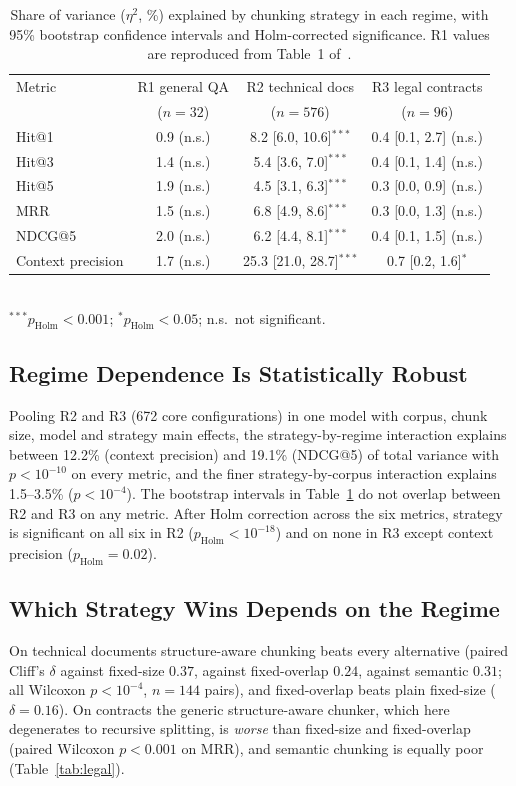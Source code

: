 \documentclass[runningheads]{llncs}
\begin{document}
\begin{table}[t]
\caption{Share of variance ($\eta^2$, \%) explained by chunking strategy in each regime, with 95\% bootstrap confidence intervals and Holm-corrected significance. R1 values are reproduced from Table~1 of~\cite{chauhan2026chunking}.}
\label{tab:regimes}
\centering
\small
\setlength{\tabcolsep}{4pt}
\begin{tabular}{lccc}
\toprule
Metric & R1 general QA & R2 technical docs & R3 legal contracts \\
 & ($n=32$) & ($n=576$) & ($n=96$) \\
\midrule
Hit@1 & 0.9 (n.s.) & 8.2 [6.0, 10.6]$^{***}$ & 0.4 [0.1, 2.7] (n.s.) \\
Hit@3 & 1.4 (n.s.) & 5.4 [3.6, 7.0]$^{***}$ & 0.4 [0.1, 1.4] (n.s.) \\
Hit@5 & 1.9 (n.s.) & 4.5 [3.1, 6.3]$^{***}$ & 0.3 [0.0, 0.9] (n.s.) \\
MRR & 1.5 (n.s.) & 6.8 [4.9, 8.6]$^{***}$ & 0.3 [0.0, 1.3] (n.s.) \\
NDCG@5 & 2.0 (n.s.) & 6.2 [4.4, 8.1]$^{***}$ & 0.4 [0.1, 1.5] (n.s.) \\
Context precision & 1.7 (n.s.) & 25.3 [21.0, 28.7]$^{***}$ & 0.7 [0.2, 1.6]$^{*}$ \\
\bottomrule
\end{tabular}
\\[2pt]{\footnotesize $^{***}p_{\mathrm{Holm}}<0.001$; $^{*}p_{\mathrm{Holm}}<0.05$; n.s.\ not significant.}
\end{table}


\subsection{Regime Dependence Is Statistically Robust}
\label{sec:interaction}
Pooling R2 and R3 (672 core configurations) in one model with corpus, chunk size, model and strategy main effects, the strategy-by-regime interaction explains between 12.2\% (context precision) and 19.1\% (NDCG@5) of total variance with $p<10^{-10}$ on every metric, and the finer strategy-by-corpus interaction explains 1.5--3.5\% ($p<10^{-4}$). The bootstrap intervals in Table~\ref{tab:regimes} do not overlap between R2 and R3 on any metric. After Holm correction across the six metrics, strategy is significant on all six in R2 ($p_{\mathrm{Holm}}<10^{-18}$) and on none in R3 except context precision ($p_{\mathrm{Holm}}=0.02$).

\subsection{Which Strategy Wins Depends on the Regime}
\label{sec:pairwise}
On technical documents structure-aware chunking beats every alternative (paired Cliff's $\delta$ against fixed-size $0.37$, against fixed-overlap $0.24$, against semantic $0.31$; all Wilcoxon $p<10^{-4}$, $n=144$ pairs), and fixed-overlap beats plain fixed-size ($\delta=0.16$). On contracts the generic structure-aware chunker, which here degenerates to recursive splitting, is \emph{worse} than fixed-size and fixed-overlap (paired Wilcoxon $p<0.001$ on MRR), and semantic chunking is equally poor (Table~\ref{tab:legal}).
\end{document}
